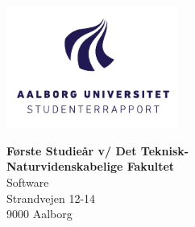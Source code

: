 

{}
\thispagestyle{empty}

\begin{minipage}[t]{0.48\textwidth}
\vspace*{-25pt}			%
\includegraphics[height=4cm]{billeder/AAU-logo-stud-DK-RGB}
\end{minipage}
\hfill
\begin{minipage}[t]{0.48\textwidth}
{\small 
\textbf{Første Studieår v/ Det Teknisk-}\\
\textbf{Naturvidenskabelige Fakultet}  \\
Software \\
Strandvejen 12-14 \\
9000 Aalborg \\}
\end{minipage}

\vspace*{1cm}

